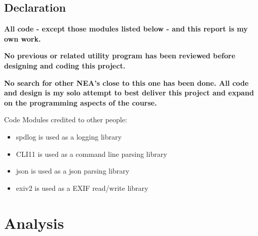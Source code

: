 \documentclass[11pt]{article}
\begin{document}


\subsection{Declaration}
\textbf{All code - except those modules listed below - and this report is my own work.}

\textbf{No previous or related utility program has been reviewed before designing and coding this project. }

\textbf{No search for other NEA's close to this one has been done. All code and design is my solo attempt to best deliver this project and expand on the programming aspects of the course.}

\bigskip

Code Modules credited to other people:
\begin{itemize}
    \item spdlog\cite{spdlog} is used as a logging library
    \item CLI11\cite{CLI11} is used as a command line parsing library
    \item json\cite{json} is used as a json parsing library
    \item exiv2\cite{exiv2} is used as a EXIF read/write library
\end{itemize}

\section{Analysis}
\end{document}

